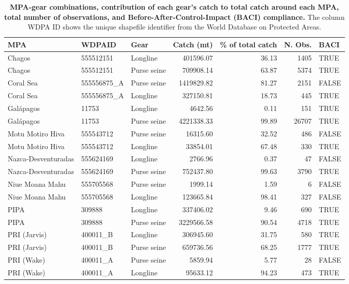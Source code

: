 \begin{table}

\caption{\label{tab:relevant_mpa_gear_combinations}\label{tab:relevant_mpa_gear_combinations}\textbf{MPA-gear combinations, contribution of each gear's catch to total catch around each MPA, total number of observations, and Before-After-Control-Impact (BACI) compliance.} The column WDPA ID shows the unique shapefile identifier from the World Database on Protected Areas.}
\centering
\begin{tabular}[t]{lllrrrl}
\toprule
MPA & WDPAID & Gear & Catch (mt) & \% of total catch & N. Obs. & BACI\\
\midrule
Chagos & 555512151 & Longline & 401596.07 & 36.13 & 1405 & TRUE\\
Chagos & 555512151 & Purse seine & 709908.14 & 63.87 & 5374 & TRUE\\
Coral Sea & 555556875\_A & Purse seine & 1419829.82 & 81.27 & 2151 & FALSE\\
Coral Sea & 555556875\_A & Longline & 327150.81 & 18.73 & 445 & TRUE\\
Galápagos & 11753 & Longline & 4642.56 & 0.11 & 151 & TRUE\\
Galápagos & 11753 & Purse seine & 4221338.33 & 99.89 & 26707 & TRUE\\
Motu Motiro Hiva & 555543712 & Purse seine & 16315.60 & 32.52 & 486 & FALSE\\
Motu Motiro Hiva & 555543712 & Longline & 33854.01 & 67.48 & 330 & TRUE\\
Nazca-Desventuradas & 555624169 & Longline & 2766.96 & 0.37 & 47 & FALSE\\
Nazca-Desventuradas & 555624169 & Purse seine & 752437.80 & 99.63 & 3790 & TRUE\\
Niue Moana Mahu & 555705568 & Purse seine & 1999.14 & 1.59 & 6 & FALSE\\
Niue Moana Mahu & 555705568 & Longline & 123665.84 & 98.41 & 327 & FALSE\\
PIPA & 309888 & Longline & 337406.02 & 9.46 & 690 & TRUE\\
PIPA & 309888 & Purse seine & 3229566.58 & 90.54 & 4718 & TRUE\\
PRI (Jarvis) & 400011\_B & Longline & 306945.60 & 31.75 & 580 & TRUE\\
PRI (Jarvis) & 400011\_B & Purse seine & 659736.56 & 68.25 & 1777 & TRUE\\
PRI (Wake) & 400011\_A & Purse seine & 5859.94 & 5.77 & 28 & FALSE\\
PRI (Wake) & 400011\_A & Longline & 95633.12 & 94.23 & 473 & TRUE\\

\end{tabular}
\end{table}
